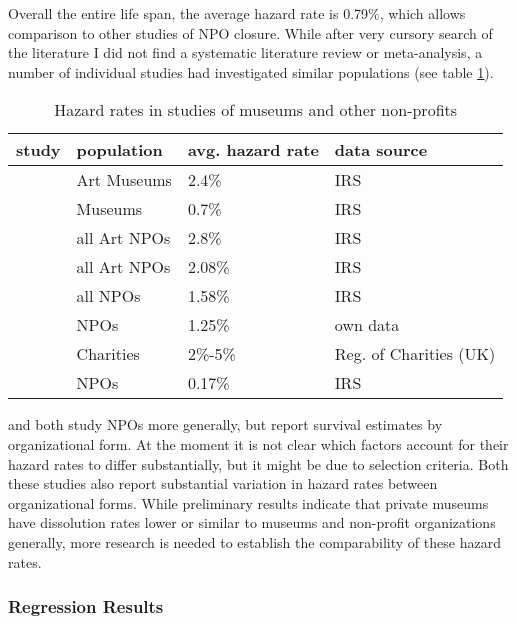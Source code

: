 \documentclass[12pt]{article}
\begin{document}
Overall the entire life span, the average hazard rate is 0.79\%, which allows comparison to other studies of NPO closure.
While after very cursory search of the literature I did not find a systematic literature review or meta-analysis, a number of individual studies had investigated similar populations (see table \ref{tbl:litreview}).

\begin{table}[htbp]
\caption{\label{tbl:litreview}Hazard rates in studies of museums and other non-profits}
\centering
\begin{tabular}{llll}
\hline
study & population & avg. hazard rate & data source\\
\hline
\cite{Hager_2001_vulnerability} & Art Museums & 2.4\% & IRS\\
\cite{Gordon_etal_2013_insolvency} & Museums & 0.7\% & IRS\\
\hline
\cite{Hager_2001_vulnerability} & all Art NPOs & 2.8\% & IRS\\
\cite{Gordon_etal_2013_insolvency} & all Art NPOs & 2.08\% & IRS\\
\cite{Gordon_etal_2013_insolvency} & all NPOs & 1.58\% & IRS\\
\cite{Hager_Galaskiewicz_Larson_2007_liability} & NPOs & 1.25\% & own data\\
\cite{Clifford_2018_reinforcing} & Charities & 2\%-5\% & Reg. of Charities (UK)\\
\cite{Mayer_2022_slimmer} & NPOs & 0.17\% & IRS\\
\hline
\end{tabular}
\end{table}

\textcite{Hager_2001_vulnerability} and \textcite{Gordon_etal_2013_insolvency} both study NPOs more generally, but report survival estimates by organizational form.
At the moment it is not clear which factors account for their hazard rates to differ substantially, but it might be due to selection criteria.
Both these studies also report substantial variation in hazard rates between organizational forms.
While preliminary results indicate that private museums have dissolution rates lower or similar to museums and non-profit organizations generally, more research is needed to establish the comparability of these hazard rates.





\subsubsection*{Regression Results}
\end{document}
